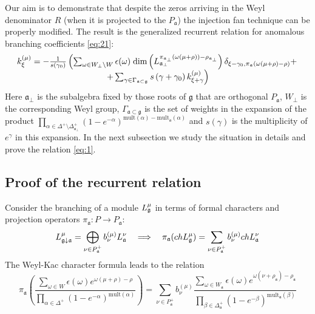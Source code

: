 \documentclass[a4paper,12pt]{article}
\theoremstyle{definition} \newtheorem{Def}{Definition}
\begin{document}
Our aim is to demonstrate that despite the zeros arriving in the Weyl denominator $R$
(when it is projected to the $P_{\mathfrak{a}}$) the injection fan technique \cite{ilyin812pbc} can be properly modified.
The result is the generalized recurrent relation for anomalous branching
coefficients \eqref{eq:21}:
\begin{equation}
  \label{eq:1}
  \begin{array}{c}
      k_{\xi }^{\left( \mu \right) }=-\frac{1}{s\left( \gamma _{0}\right) }\left(
  \sum_{\omega\in W_{\bot}\backslash W} \epsilon(\omega)\; {\rm dim}\left(L^{\pi_{\mathfrak{a}_{\bot}}(\omega(\mu+\rho))-\rho_{\mathfrak{a}_{\bot}}}_{\mathfrak{a}_{\bot}}\right) \delta_{\xi-\gamma_0,\pi_{\mathfrak{a}}(\omega(\mu+\rho)-\rho)}+ \right.\\
\left.
+\sum_{\gamma \in
\Gamma _{\frak{a}\subset \frak{g}}}s\left( \gamma +\gamma _{0}\right) k_{\xi
+\gamma }^{\left( \mu \right) }\right)
  \end{array}
   \end{equation}
Here $\mathfrak{a}_{\bot}$ is the subalgebra fixed by those roots of $\mathfrak{g}$ that are
orthogonal $P_{\mathfrak{a}}$, $W_{\bot}$ is the corresponding Weyl group,
$\Gamma_{\mathfrak{a}\subset \mathfrak{g}}$ is the set of weights in the expansion
of the product $\prod_{\alpha\in \Delta^{+}\setminus \Delta^{+}_{\mathfrak{a}_{\bot}}}
(1-e^{-\alpha})^{\mathrm{mult}(\alpha)-\mathrm{mult}_{\mathfrak{a}}(\alpha)}$ and $s(\gamma)$
is the multiplicity of $e^{\gamma}$ in this expansion.
In the next subsection we study the situation in details and prove the relation \eqref{eq:1}.

\subsection{Proof of the recurrent relation}
\label{sec:proof}

Consider the branching of a module $L_{\frak{g}}^{\mu }$ in terms of formal characters and
projection operators $\pi_{\mathfrak{a}}:P\to P_{\mathfrak{a}}$:
\begin{equation}
  \label{eq:3}
  L_{\frak{g}\downarrow \frak{a}}^{\mu }=\bigoplus\limits_{\nu \in P_{\frak{a}%
    }^{+}}b_{\nu }^{\left( \mu \right) }L_{\frak{a}}^{\nu }\quad
  \Longrightarrow\quad
  \pi_{\mathfrak{a}}(ch L^{\mu}_{\mathfrak{g}})=
  \sum_{\nu\in P^{+}_{\mathfrak{a}}}b^{(\mu)}_{\nu} ch L^{\nu}_{\mathfrak{a}}
\end{equation}
The Weyl-Kac character formula leads to
the relation
\begin{equation}
  \label{eq:4}
  \pi_{\mathfrak{a}}\left(\frac{\sum_{\omega\in W} \epsilon(\omega) e^{\omega(\mu+\rho)-\rho}}
  {\prod_{\alpha\in\Delta^{+}}(1-e^{-\alpha})^{\mathrm{mult}(\alpha)}}\right) =
  \sum_{\nu\in P^{+}_{\mathfrak{a}}}b^{(\mu)}_{\nu}
  \frac{\sum_{\omega\in W_{\mathfrak{a}}}\epsilon(\omega)
  e^{\omega(\nu+\rho_{\mathfrak{a}})-\rho_{\mathfrak{a}}}}
  {\prod_{\beta\in \Delta_{\mathfrak{a}}^{+}}(1-e^{-\beta})^{\mathrm{mult}_{\mathfrak{a}}(\beta)}}
\end{equation}
\end{document}

